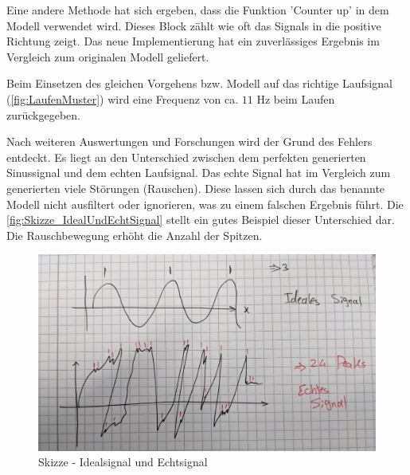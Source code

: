 Eine andere Methode hat sich ergeben, dass die Funktion 'Counter up' in dem Modell verwendet wird. Dieses Block zählt wie oft das Signals in die positive Richtung zeigt. Das neue Implementierung hat ein zuverlässiges Ergebnis im Vergleich zum originalen Modell geliefert.

Beim Einsetzen des gleichen Vorgehens bzw. Modell auf das richtige Laufsignal (\autoref{fig:LaufenMuster}) wird eine Frequenz von ca. $11$ Hz beim Laufen zurückgegeben.

Nach weiteren Auswertungen und Forschungen wird der Grund des Fehlers entdeckt. Es liegt an den Unterschied zwischen dem perfekten generierten Sinussignal und dem echten Laufsignal. Das echte Signal hat im Vergleich zum generierten viele Störungen (Rauschen). Diese lassen sich durch das benannte Modell nicht ausfiltert oder ignorieren, was zu einem falschen Ergebnis führt. Die \autoref{fig:Skizze_IdealUndEchtSignal} stellt ein gutes Beispiel dieser Unterschied dar. Die Rauschbewegung erhöht die Anzahl der Spitzen.


\begin{figure}[H]
	\centering
	\includegraphics[width=\linewidth]{Bilder/Skizze_IdealUndEchtSignal.jpg}
	\caption{Skizze - Idealsignal und Echtsignal}
	\label{fig:Skizze_IdealUndEchtSignal}
\end{figure}




